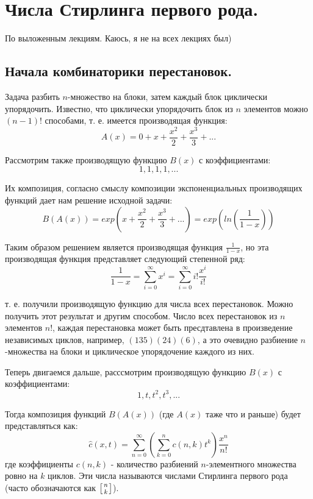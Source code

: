 \chapter{Числа Стирлинга первого рода.}

По выложенным лекциям. Каюсь, я не на всех лекциях был)

\section{Начала комбинаторики перестановок.}

Задача разбить $n$-множество на блоки, затем каждый блок циклически упорядочить. Известно, что циклически упорядочить блок из $n$ элементов можно $\left(n-1\right)!$ способами, т. е. имеется производящая функция:
\[
	A\left(x\right) = 0 + x + \frac{x^2}{2} + \frac{x^3}{3} + ...
\]

Рассмотрим также производящую функцию $B\left(x\right)$ с коэффициентами:
\[
	1, 1, 1, 1, ...
\]

Их композиция, согласно смыслу композиции экспоненциальных производящих функций дает нам решение исходной задачи:
\[
	B\left(A\left(x\right)\right) = exp\left(x + \frac{x^2}{2} + \frac{x^3}{3} + ... \right) = exp\left(ln\left(\frac{1}{1-x}\right)\right)
\]

Таким образом решением является производящая функция $\frac{1}{1 - x}$, но эта производящая функция представляет следующий степенной ряд:
\[
	\frac{1}{1 - x} = \sum_{i=0}^{\infty} x^i = \sum_{i=0}^{\infty}i!\frac{x^i}{i!}
\]

т. е. получили производящую функцию для числа всех перестановок. Можно получить этот результат и другим способом. Число всех перестановок из $n$ элементов $n!$, каждая перестановка может быть пресдтавлена в произведение независимых циклов, например, $\left(1 3 5\right)\left(2 4\right)\left(6\right)$, а это очевидно разбиение $n$-множества на блоки и циклическое упорядочение каждого из них.

Теперь двигаемся дальше, расссмотрим производящую функцию $B\left(x\right)$ с коэффициентами:
\[
	1, t, t^2, t^3, ...
\]

Тогда композиция функций $B\left(A\left(x\right)\right)$ (где $A\left(x\right)$ таже что и раньше) будет представляться как:
\[
	\hat c\left(x,t\right) = \sum_{n=0}^{\infty}\left(\sum_{k=0}^n c\left(n,k\right) t^k\right) \frac{x^n}{n!}
\]
где коэффициенты $c\left(n,k\right)$ - количество разбиений $n$-элементного множества ровно на $k$ циклов. Эти числа называются числами Стирлинга первого рода (часто обозначаются как $\left[n \atop k\right]$).

